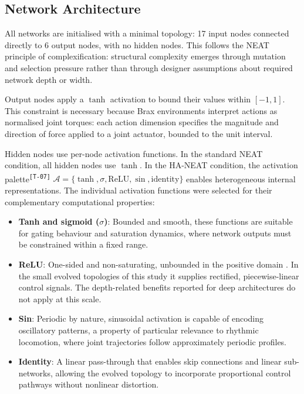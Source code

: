\documentclass[12pt]{article}
\newcommand{\revID}[1]{\textsuperscript{\scriptsize\texttt{[#1]}}}
\newcommand{\revTerm}[2]{\textcolor{lrTeal}{#2}\revID{#1}}      %
\begin{document}
\subsection{Network Architecture}
\label{subsec:network-architecture}

All networks are initialised with a minimal topology: 17 input nodes connected directly to 6 output nodes, with no hidden nodes.
This follows the NEAT principle of complexification: structural complexity emerges through mutation and selection pressure rather than through designer assumptions about required network depth or width.

Output nodes apply a $\tanh$ activation to bound their values within $[-1, 1]$.
This constraint is necessary because Brax environments interpret actions as normalised joint torques: each action dimension specifies the magnitude and direction of force applied to a joint actuator, bounded to the unit interval.

Hidden nodes use per-node activation functions.
In the standard NEAT condition, all hidden nodes use $\tanh$.
In the HA-NEAT condition, \revTerm{T-07}{the activation palette} $\mathcal{A} = \{\tanh, \sigma, \text{ReLU}, \sin, \text{identity}\}$ enables heterogeneous internal representations.
The individual activation functions were selected for their complementary computational properties:

\begin{itemize}
    \item \textbf{Tanh and sigmoid ($\sigma$)}: Bounded and smooth, these functions are suitable for gating behaviour and saturation dynamics, where network outputs must be constrained within a fixed range.
    \item \textbf{ReLU}: One-sided and non-saturating, unbounded in the positive domain \parencite{nair_rectified_2010}. In the small evolved topologies of this study it supplies rectified, piecewise-linear control signals. The depth-related benefits reported for deep architectures do not apply at this scale.
    \item \textbf{Sin}: Periodic by nature, sinusoidal activation is capable of encoding oscillatory patterns, a property of particular relevance to rhythmic locomotion, where joint trajectories follow approximately periodic profiles.
    \item \textbf{Identity}: A linear pass-through that enables skip connections and linear sub-networks, allowing the evolved topology to incorporate proportional control pathways without nonlinear distortion.
\end{itemize}
\end{document}
